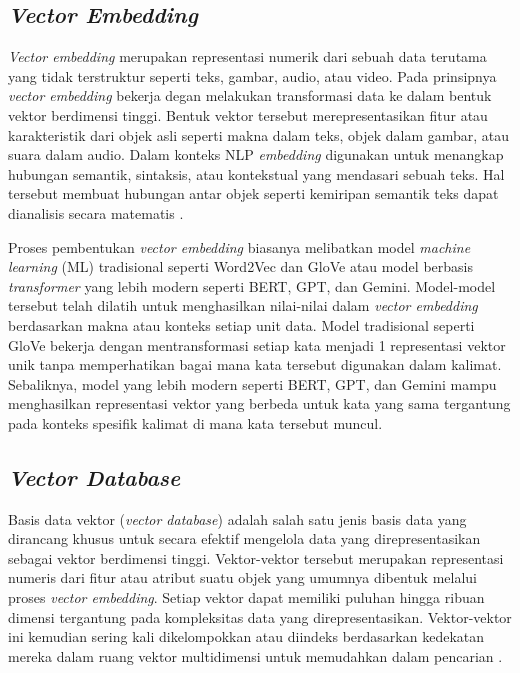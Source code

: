 \subsection{\textit{Vector Embedding}}
\textit{Vector embedding} merupakan representasi numerik dari sebuah data terutama yang tidak terstruktur seperti teks, gambar, audio, atau video.
Pada prinsipnya \textit{vector embedding} bekerja degan melakukan transformasi data ke dalam bentuk vektor berdimensi tinggi.
Bentuk vektor tersebut merepresentasikan fitur atau karakteristik dari objek asli seperti makna dalam teks, objek dalam gambar, atau suara dalam audio.
Dalam konteks NLP \textit{embedding} digunakan untuk menangkap hubungan semantik, sintaksis, atau kontekstual yang mendasari sebuah teks.
Hal tersebut membuat hubungan antar objek seperti kemiripan semantik teks dapat dianalisis secara matematis \cite{Singh2023EmbeddingVectorAndVectorDB}.

Proses pembentukan \textit{vector embedding} biasanya melibatkan model \textit{machine learning} (ML) tradisional seperti Word2Vec dan GloVe atau model berbasis \textit{transformer} yang lebih modern seperti BERT, GPT, dan Gemini.
Model-model tersebut telah dilatih untuk menghasilkan nilai-nilai dalam \textit{vector embedding} berdasarkan makna atau konteks setiap unit data.
Model tradisional seperti GloVe bekerja dengan mentransformasi setiap kata menjadi 1 representasi vektor unik tanpa memperhatikan bagai mana kata tersebut digunakan dalam kalimat.
Sebaliknya, model yang lebih modern seperti BERT, GPT, dan Gemini mampu menghasilkan representasi vektor yang berbeda untuk kata yang sama tergantung pada konteks spesifik kalimat di mana kata tersebut muncul.


\subsection{\textit{Vector Database}}
Basis data vektor (\textit{vector database}) adalah salah satu jenis basis data yang dirancang khusus untuk secara efektif mengelola data yang direpresentasikan sebagai vektor berdimensi tinggi.
Vektor-vektor tersebut merupakan representasi numeris dari fitur atau atribut suatu objek yang umumnya dibentuk melalui proses \textit{vector embedding}.
Setiap vektor dapat memiliki puluhan hingga ribuan dimensi tergantung pada kompleksitas data yang direpresentasikan.
Vektor-vektor ini kemudian sering kali dikelompokkan atau diindeks berdasarkan kedekatan mereka dalam ruang vektor multidimensi untuk memudahkan dalam pencarian \cite{Han2023VectorDB_ANN_SimilaritySearch}.

